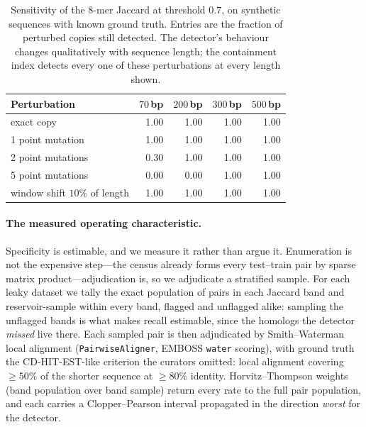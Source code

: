 \documentclass[11pt,a4paper]{article}
\begin{document}
\begin{table}[htbp]
\centering
\caption{Sensitivity of the $8$-mer Jaccard at threshold $0.7$, on synthetic sequences with known
ground truth. Entries are the fraction of perturbed copies still detected. The detector's behaviour
changes qualitatively with sequence length; the containment index detects every one of these
perturbations at every length shown.}\label{tab:sens}
\footnotesize
\begin{tabular}{@{}lrrrr@{}}
\toprule
Perturbation & $70$\,bp & $200$\,bp & $300$\,bp & $500$\,bp\\
\midrule
exact copy                     & 1.00 & 1.00 & 1.00 & 1.00\\
1 point mutation               & 1.00 & 1.00 & 1.00 & 1.00\\
2 point mutations              & 0.30 & 1.00 & 1.00 & 1.00\\
5 point mutations              & 0.00 & 0.00 & 1.00 & 1.00\\
window shift $10\%$ of length  & 1.00 & 1.00 & 1.00 & 1.00\\
\bottomrule
\end{tabular}
\end{table}

\paragraph{The measured operating characteristic.} Specificity is estimable, and we measure it
rather than argue it. Enumeration is not the expensive step---the census already forms every
test--train pair by sparse matrix product---adjudication is, so we adjudicate a stratified sample.
For each leaky dataset we tally the exact population of pairs in each Jaccard band and
reservoir-sample within every band, flagged and unflagged alike: sampling the unflagged bands is
what makes recall estimable, since the homologs the detector \emph{missed} live there. Each sampled
pair is then adjudicated by Smith--Waterman local alignment (\texttt{PairwiseAligner}, EMBOSS
\texttt{water} scoring), with ground truth the CD-HIT-EST-like criterion the curators omitted:
local alignment covering ${\ge}50\%$ of the shorter sequence at ${\ge}80\%$ identity. Horvitz--Thompson
weights (band population over band sample) return every rate to the full pair population, and each
carries a Clopper--Pearson interval propagated in the direction \emph{worst} for the detector.
\end{document}
